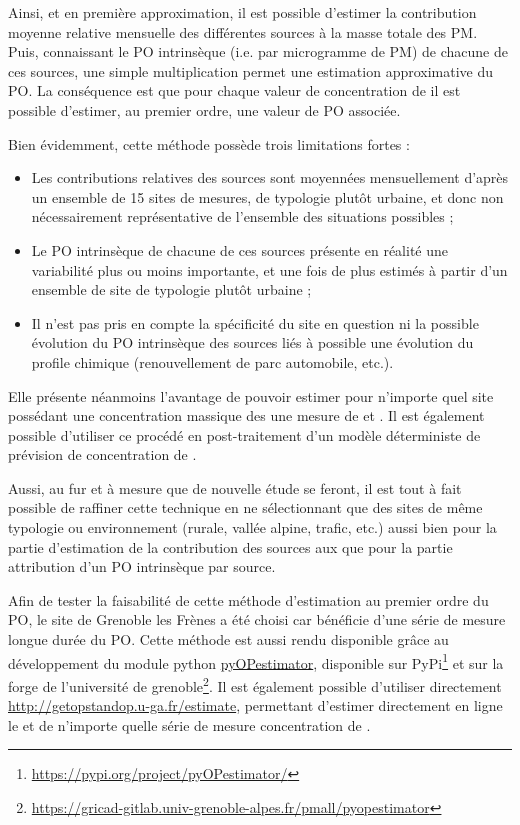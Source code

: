 Ainsi, et en première approximation, il est possible d'estimer la contribution moyenne
relative mensuelle des différentes sources à la masse totale des PM. Puis, connaissant le
PO intrinsèque (i.e. par microgramme de PM) de chacune de ces sources, une simple
multiplication permet une estimation approximative du PO.  La conséquence est que pour
chaque valeur de concentration de \PMdix{} il est possible d'estimer, au premier ordre,
une valeur de PO associée.

Bien évidemment, cette méthode possède trois limitations fortes : 
\begin{itemize}
    \item Les contributions relatives des sources sont moyennées mensuellement d'après un
        ensemble de 15 sites de mesures, de typologie plutôt urbaine, et donc non
        nécessairement représentative de l'ensemble des situations possibles ;
    \item Le PO intrinsèque de chacune de ces sources présente en réalité une variabilité
        plus ou moins importante, et une fois de plus estimés à partir d'un ensemble de
        site de typologie plutôt urbaine ;
    \item Il n'est pas pris en compte la spécificité du site en question ni la possible
        évolution du PO intrinsèque des sources liés à possible une évolution du profile
        chimique (renouvellement de parc automobile, etc.).
\end{itemize}

Elle présente néanmoins l'avantage de pouvoir estimer pour n'importe quel site possédant
une concentration massique des \PMdix{} une mesure de \POAAv{} et \PODTTv. Il est
également possible d'utiliser ce procédé en post-traitement d'un modèle déterministe de
prévision de concentration de \PMdix.

Aussi, au fur et à mesure que de nouvelle étude se feront, il est tout à fait possible de
raffiner cette technique en ne sélectionnant que des sites de même typologie ou
environnement (rurale, vallée alpine, trafic, etc.) aussi bien pour la partie d'estimation
de la contribution des sources aux \PMdix{} que pour la partie attribution d'un PO
intrinsèque par source.

Afin de tester la faisabilité de cette méthode d'estimation au premier ordre du PO, le
site de Grenoble les Frènes a été choisi car bénéficie d'une série de mesure longue durée
du PO. Cette méthode est aussi rendu disponible grâce au développement du module python
\href{https://gricad-gitlab.univ-grenoble-alpes.fr/pmall/pyopestimator}{pyOPestimator},
disponible sur PyPi\footnote{\url{https://pypi.org/project/pyOPestimator/}} et sur la
forge de l'université de
grenoble\footnote{\url{https://gricad-gitlab.univ-grenoble-alpes.fr/pmall/pyopestimator}}.
Il est également possible d'utiliser directement
\url{http://getopstandop.u-ga.fr/estimate}, permettant d'estimer directement en ligne le
\POAAv{} et \PODTTv{} de n'importe quelle série de mesure concentration de \PMdix.

